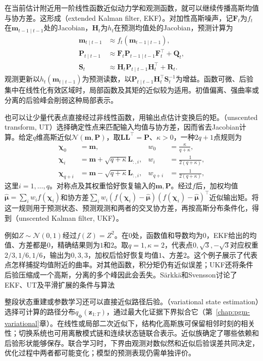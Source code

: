 在当前估计附近用一阶线性函数近似动力学和观测函数，就可以继续传播高斯均值与协方差。这形成（extended Kalman filter, EKF）。对加性高斯噪声，记$\bm F_t$为$f_t$在$\bm m_{t-1\mid t-1}$处的Jacobian，$\bm H_t$为$h_t$在预测均值处的Jacobian，预测计算为
\[
  \begin{aligned}
    \bm m_{t\mid t-1}&\approx f_t(\bm m_{t-1\mid t-1}),\\
    \bm P_{t\mid t-1}
      &\approx\bm F_t\bm P_{t-1\mid t-1}\bm F_t^\top+\bm Q_t,\\
    \bm S_t&\approx\bm H_t\bm P_{t\mid t-1}\bm H_t^\top+\bm R_t.
  \end{aligned}
\]
观测更新以$h_t(\bm m_{t\mid t-1})$为预测读数，以$\bm P_{t\mid t-1}\bm H_t^\top\bm S_t^{-1}$为增益。函数可微、后验集中在线性化有效区域时，局部函数及其矩的近似较为适用。初值偏离、强曲率或分离的后验峰会削弱这种局部表示。

也可以让少量代表点直接经过非线性函数，用输出点估计变换后的矩。（unscented transform, UT）选择确定性点来匹配输入均值与协方差，因而省去Jacobian计算。给定$q$维高斯近似$\mathcal N(\bm m,\bm P)$，取$\bm L\bm L^\top=\bm P$、$\kappa>0$，一种$2q+1$点规则为
\[
  \begin{aligned}
    \bm\chi_0&=\bm m,&w_0&=\frac{\kappa}{q+\kappa},\\
    \bm\chi_i&=\bm m+\sqrt{q+\kappa}\bm L_{:,i},
      &w_i&=\frac{1}{2(q+\kappa)},\\
    \bm\chi_{q+i}&=\bm m-\sqrt{q+\kappa}\bm L_{:,i},
      &w_{q+i}&=\frac{1}{2(q+\kappa)},
  \end{aligned}
\]
这里$i=1,\ldots,q$。对称点及其权重恰好恢复输入的$\bm m,\bm P$。经过$f$后，加权均值$\widehat{\bm\mu}=\sum_iw_i f(\bm\chi_i)$和协方差$\sum_iw_i(f(\bm\chi_i)-\widehat{\bm\mu})(f(\bm\chi_i)-\widehat{\bm\mu})^\top$近似输出矩。将这一规则用于预测状态、预测观测和两者的交叉协方差，再按高斯分布条件化，得到（unscented Kalman filter, UKF）。

例如$Z\sim\mathcal N(0,1)$经过$f(Z)=Z^2$。在$0$处，函数值和导数均为$0$，EKF给出的均值、方差都是$0$，精确结果则为$1$和$2$。取$q=1,\kappa=2$，代表点$0,\sqrt3,-\sqrt3$对应权重$2/3,1/6,1/6$，输出为$0,3,3$，加权后恰好恢复均值$1$、方差$2$。这个例子展示了代表点怎样捕捉均值附近的曲率。对其他函数，积分矩仍有近似误差；UKF还将条件后验压缩成一个高斯，分离的多个峰因此会丢失。Särkkä和Svensson讨论了EKF、UT及平滑扩展的条件与算法

整段状态重建或参数学习还可以直接近似路径后验。（variational state estimation）选择可计算的路径分布$q_{\bm\phi}(\bm z_{1:T})$，通过最大化证据下界拟合它（第~\ref{chap:pgm-variational}章）。在线性或局部二次近似下，结构化高斯族可保留相邻时刻的相关性；切换系统也可用离散模式链和连续状态链联合表示。近似族确定了哪些依赖和后验形状能够保存。联合学习时，下界由观测对数似然和近似后验误差共同决定，优化过程中两者都可能变化；模型的预测表现仍需单独评价。

